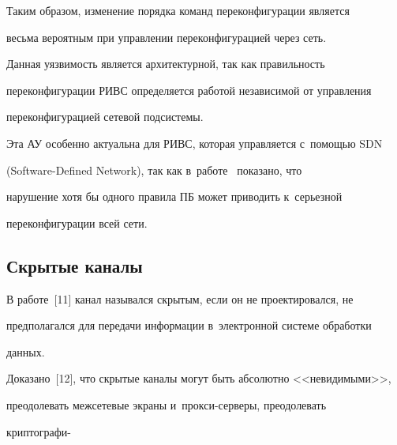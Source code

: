   Таким образом, изменение порядка команд переконфигурации является 


весьма вероятным при управлении переконфигурацией через сеть. 


  


  Данная уязвимость является архитектурной, так как правильность 


переконфигурации РИВС определяется работой независимой от управления 


переконфигурацией сетевой подсистемы. 


  


  Эта АУ особенно актуальна для РИВС, которая управляется с~помощью SDN 


(Software-Defined Network), так как в~работе~\cite{10-g2} показано, что 


нарушение хотя бы одного правила ПБ может приводить к~серьезной 


переконфигурации всей сети.





\vspace*{-2pt}


  


\subsection{Скрытые каналы }





\vspace*{-2pt}





  В работе~[11] канал назывался скрытым, если он не проектировался, не 


предполагался для передачи информации в~электронной системе обработки 


данных. 


  


  Доказано~[12], что скрытые каналы могут быть абсолютно <<невидимыми>>, 


преодолевать межсетевые экраны и~прок\-си-сер\-ве\-ры, преодолевать 


криптографи-\linebreak\vspace*{-12pt}





